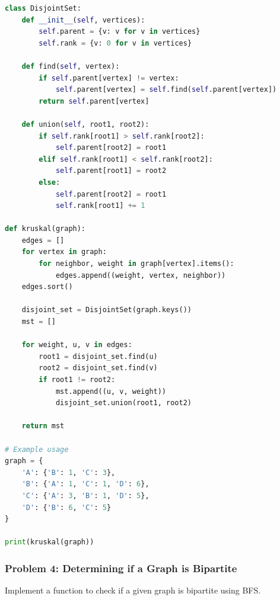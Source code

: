 \documentclass[12pt]{book} %
\begin{document}
\FloatBarrier
\begin{lstlisting}[language=Python, caption=Python implementation of Kruskal's Algorithm]
class DisjointSet:
    def __init__(self, vertices):
        self.parent = {v: v for v in vertices}
        self.rank = {v: 0 for v in vertices}

    def find(self, vertex):
        if self.parent[vertex] != vertex:
            self.parent[vertex] = self.find(self.parent[vertex])
        return self.parent[vertex]

    def union(self, root1, root2):
        if self.rank[root1] > self.rank[root2]:
            self.parent[root2] = root1
        elif self.rank[root1] < self.rank[root2]:
            self.parent[root1] = root2
        else:
            self.parent[root2] = root1
            self.rank[root1] += 1

def kruskal(graph):
    edges = []
    for vertex in graph:
        for neighbor, weight in graph[vertex].items():
            edges.append((weight, vertex, neighbor))
    edges.sort()
    
    disjoint_set = DisjointSet(graph.keys())
    mst = []

    for weight, u, v in edges:
        root1 = disjoint_set.find(u)
        root2 = disjoint_set.find(v)
        if root1 != root2:
            mst.append((u, v, weight))
            disjoint_set.union(root1, root2)
    
    return mst

# Example usage
graph = {
    'A': {'B': 1, 'C': 3},
    'B': {'A': 1, 'C': 1, 'D': 6},
    'C': {'A': 3, 'B': 1, 'D': 5},
    'D': {'B': 6, 'C': 5}
}

print(kruskal(graph))
\end{lstlisting}
\FloatBarrier

\subsubsection*{Problem 4: Determining if a Graph is Bipartite}
Implement a function to check if a given graph is bipartite using BFS.
\end{document}
